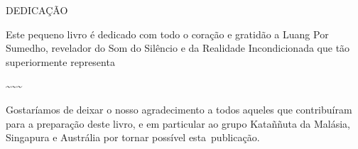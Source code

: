 \cleartorecto
\thispagestyle{empty}

\mbox{}
\vfill

{\centering
\setlength{\parskip}{5pt}%
\footnotesize

{\large\chapterTitleFont\color{chaptertitle} DEDICAÇÃO}

\bigskip

Este pequeno livro é dedicado com todo o coração e gratidão a Luang Por
Sumedho, revelador do Som do Silêncio e da Realidade Incondicionada que
tão superiormente representa

\textasciitilde{}\textasciitilde{}\textasciitilde{}

Gostaríamos de deixar o nosso agradecimento a todos aqueles que
contribuíram para a preparação deste livro, e em particular ao grupo
Kataññuta da Malásia, Singapura e Austrália por tornar possível esta~publicação.

}

\vfill
\mbox{}